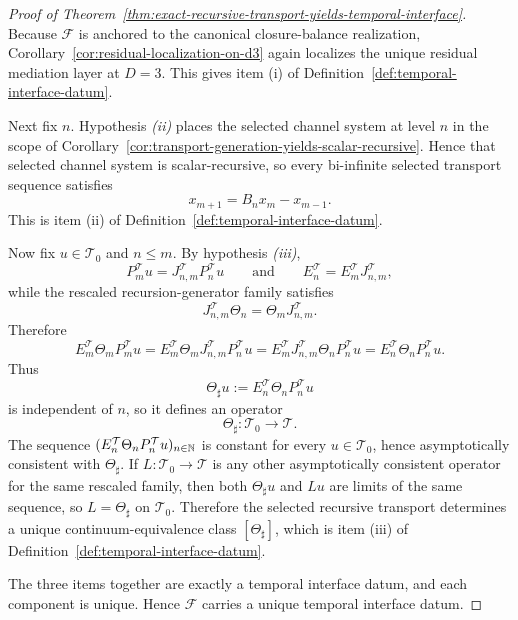 \begin{proof}[Proof of Theorem~\ref{thm:exact-recursive-transport-yields-temporal-interface}]
\label{proof:thm:exact-recursive-transport-yields-temporal-interface}
Because \(\mathcal F\) is anchored to the canonical closure-balance
realization, Corollary~\ref{cor:residual-localization-on-d3} again localizes
the unique residual mediation layer at \(D=3\). This gives item (i) of
Definition~\ref{def:temporal-interface-datum}.

Next fix \(n\). Hypothesis \emph{(ii)} places the selected channel system at
level \(n\) in the scope of
Corollary~\ref{cor:transport-generation-yields-scalar-recursive}. Hence that
selected channel system is scalar-recursive, so every bi-infinite selected
transport sequence satisfies
\[
x_{m+1}=B_nx_m-x_{m-1}.
\]
This is item (ii) of
Definition~\ref{def:temporal-interface-datum}.

Now fix \(u\in\mathcal T_0\) and \(n\le m\). By hypothesis \emph{(iii)},
\[
P_m^{\mathcal T}u=J^{\mathcal T}_{n,m}P_n^{\mathcal T}u
\qquad\text{and}\qquad
E_n^{\mathcal T}=E_m^{\mathcal T}J^{\mathcal T}_{n,m},
\]
while the rescaled recursion-generator family satisfies
\[
J^{\mathcal T}_{n,m}\Theta_n=\Theta_mJ^{\mathcal T}_{n,m}.
\]
Therefore
\[
E_m^{\mathcal T}\Theta_mP_m^{\mathcal T}u
=
E_m^{\mathcal T}\Theta_mJ^{\mathcal T}_{n,m}P_n^{\mathcal T}u
=
E_m^{\mathcal T}J^{\mathcal T}_{n,m}\Theta_nP_n^{\mathcal T}u
=
E_n^{\mathcal T}\Theta_nP_n^{\mathcal T}u.
\]
Thus
\[
\Theta_\sharp u:=E_n^{\mathcal T}\Theta_nP_n^{\mathcal T}u
\]
is independent of \(n\), so it defines an operator
\[
\Theta_\sharp:\mathcal T_0\to\mathcal T.
\]
The sequence \((E_n^{\mathcal T}\Theta_nP_n^{\mathcal T}u)_{n\in\mathbb{N}}\) is
constant for every \(u\in\mathcal T_0\), hence asymptotically consistent with
\(\Theta_\sharp\). If \(L:\mathcal T_0\to\mathcal T\) is any other
asymptotically consistent operator for the same rescaled family, then both
\(\Theta_\sharp u\) and \(Lu\) are limits of the same sequence, so
\(L=\Theta_\sharp\) on \(\mathcal T_0\). Therefore the selected recursive
transport determines a unique continuum-equivalence class \([\Theta_\sharp]\),
which is item (iii) of Definition~\ref{def:temporal-interface-datum}.

The three items together are exactly a temporal interface datum, and each
component is unique. Hence \(\mathcal F\) carries a unique temporal interface
datum.
\end{proof}

